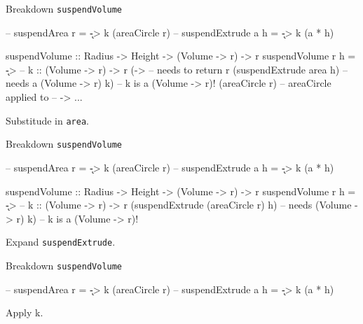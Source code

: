\documentclass[ignorenonframetext,]{beamer}
\begin{document}
\begin{frame}[fragile]{Breakdown \texttt{suspendVolume}}

\begin{haskellcode}
-- suspendArea r = \k -> k (areaCircle r)
-- suspendExtrude a h = \k -> k (a * h)
\end{haskellcode}

\begin{haskellcode}
suspendVolume :: Radius -> Height -> (Volume -> r) -> r
suspendVolume r h = \k ->      -- k :: (Volume -> r) -> r
  (\area ->                    -- needs to return r
    (suspendExtrude area h)    -- needs a (Volume -> r)
      k)                       -- k is a (Volume -> r)!
  (areaCircle r)               -- areaCircle applied to
                               --   \area -> ...
\end{haskellcode}

Substitude in \texttt{area}.

\end{frame}

\begin{frame}[fragile]{Breakdown \texttt{suspendVolume}}

\begin{haskellcode}
-- suspendArea r = \k -> k (areaCircle r)
-- suspendExtrude a h = \k -> k (a * h)
\end{haskellcode}

\begin{haskellcode}
suspendVolume :: Radius -> Height -> (Volume -> r) -> r
suspendVolume r h = \k ->      -- k :: (Volume -> r) -> r
  (suspendExtrude (areaCircle r) h) -- needs (Volume -> r)
      k)                       -- k is a (Volume -> r)!
\end{haskellcode}

Expand \texttt{suspendExtrude}.

\end{frame}

\begin{frame}[fragile]{Breakdown \texttt{suspendVolume}}

\begin{haskellcode}
-- suspendArea r = \k -> k (areaCircle r)
-- suspendExtrude a h = \k -> k (a * h)
\end{haskellcode}


Apply k.

\end{frame}
\end{document}
